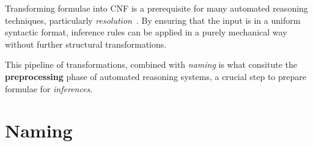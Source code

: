 Transforming formulae into CNF is a prerequisite for many automated reasoning techniques, particularly \textit{resolution}~\cite{chang1997}.  
By ensuring that the input is in a uniform syntactic format, inference rules can be applied in a purely mechanical way without further structural transformations.

This pipeline of transformations, combined with \textit{naming} is what consitute the \textbf{preprocessing} phase of automated reasoning systems, a crucial step to prepare formulae for \textit{inferences}.



\section{Naming}



